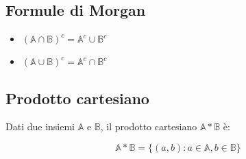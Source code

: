 \documentclass{article}
\begin{document}
\subsection{Formule di Morgan}

\begin{itemize}
    \item $(\mathbb{A} \cap \mathbb{B})^c = \mathbb{A}^c \cup \mathbb{B}^c$
    \item $(\mathbb{A} \cup \mathbb{B})^c = \mathbb{A}^c \cap \mathbb{B}^c$
\end{itemize}

\subsection{Prodotto cartesiano}

Dati due insiemi $\mathbb{A}$ e $\mathbb{B}$, il prodotto cartesiano $\mathbb{A} * \mathbb{B}$ è:

$$
\mathbb{A} * \mathbb{B} = \{ (a,b) : a \in \mathbb{A}, b \in \mathbb{B} \}
$$
\end{document}
